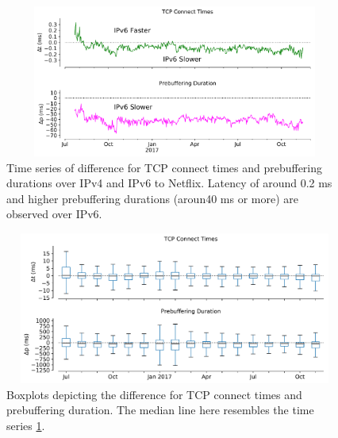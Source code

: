 \begin{figure}[!ht]
	\centering
	\includegraphics[keepaspectratio, height=5cm, width=15cm]{figures/tcp/netflix-delay-timeseries.pdf}
	\caption[TCP Connect Times and Prebuffering Duration Timeseries]{Time series of difference for TCP connect times and prebuffering durations over IPv4 and IPv6 to Netflix. Latency of around 0.2 ms and higher prebuffering durations (aroun40 ms or more) are observed over IPv6.}
	\label{fig:TCP Connect Times and Prebuffering Duration Timeseries}
\end{figure}
\begin{figure}[!ht]
	\centering
	\includegraphics[keepaspectratio, height=5cm, width=15cm]{figures/tcp/netflix-delay-boxplot.pdf}
	\caption[TCP Connect Times and Prebuffering Duration Boxplot]{Boxplots depicting the difference for TCP connect times and prebuffering duration. The median line here resembles the time series \cref{fig:TCP Connect Times and Prebuffering Duration Timeseries}.}
	\label{fig:TCP Connect Times and Prebuffering Duration Boxplot}
\end{figure}

